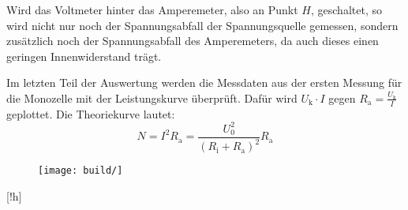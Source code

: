 Wird das Voltmeter hinter das Amperemeter, also an Punkt $H$, geschaltet, so wird
nicht nur noch der Spannungsabfall der Spannungsquelle gemessen, sondern zusätzlich
noch der Spannungsabfall des Amperemeters, da auch dieses einen geringen Innenwiderstand
trägt.

Im letzten Teil der Auswertung werden die Messdaten aus der ersten Messung für die Monozelle
mit der Leistungskurve überprüft. Dafür wird $U_\text{k} \cdot I$ gegen $R_\text{a} = \frac{U_\text{k}}{I}$
geplottet. Die Theoriekurve lautet:
\begin{equation}
  N = I^2 R_\text{a} = \frac{U_\text{0}^2}{(R_\text{i}+ R_\text{a})^2} R_\text{a}
\end{equation}

\begin{figure}[!h]
  \centering
  \texttt{[image: build/]}
\end{figure}[!h]
